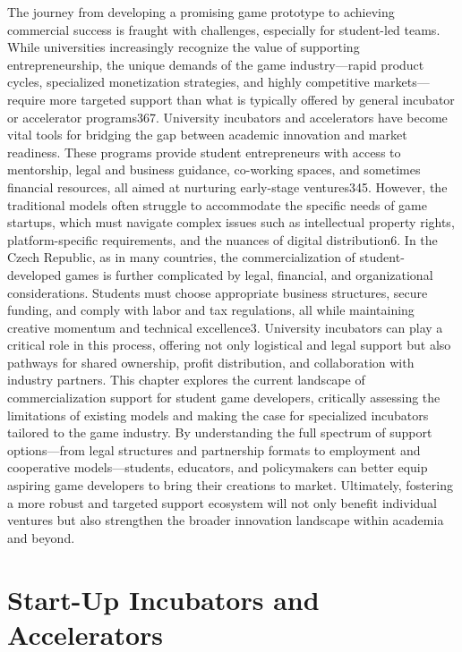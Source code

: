 The journey from developing a promising game prototype to achieving commercial success is fraught with challenges, especially for student-led teams. While universities increasingly recognize the value of supporting entrepreneurship, the unique demands of the game industry—rapid product cycles, specialized monetization strategies, and highly competitive markets—require more targeted support than what is typically offered by general incubator or accelerator programs367.
University incubators and accelerators have become vital tools for bridging the gap between academic innovation and market readiness. These programs provide student entrepreneurs with access to mentorship, legal and business guidance, co-working spaces, and sometimes financial resources, all aimed at nurturing early-stage ventures345. However, the traditional models often struggle to accommodate the specific needs of game startups, which must navigate complex issues such as intellectual property rights, platform-specific requirements, and the nuances of digital distribution6.
In the Czech Republic, as in many countries, the commercialization of student-developed games is further complicated by legal, financial, and organizational considerations. Students must choose appropriate business structures, secure funding, and comply with labor and tax regulations, all while maintaining creative momentum and technical excellence3. University incubators can play a critical role in this process, offering not only logistical and legal support but also pathways for shared ownership, profit distribution, and collaboration with industry partners.
This chapter explores the current landscape of commercialization support for student game developers, critically assessing the limitations of existing models and making the case for specialized incubators tailored to the game industry. By understanding the full spectrum of support options—from legal structures and partnership formats to employment and cooperative models—students, educators, and policymakers can better equip aspiring game developers to bring their creations to market. Ultimately, fostering a more robust and targeted support ecosystem will not only benefit individual ventures but also strengthen the broader innovation landscape within academia and beyond.
   
\section{Start-Up Incubators and Accelerators}
